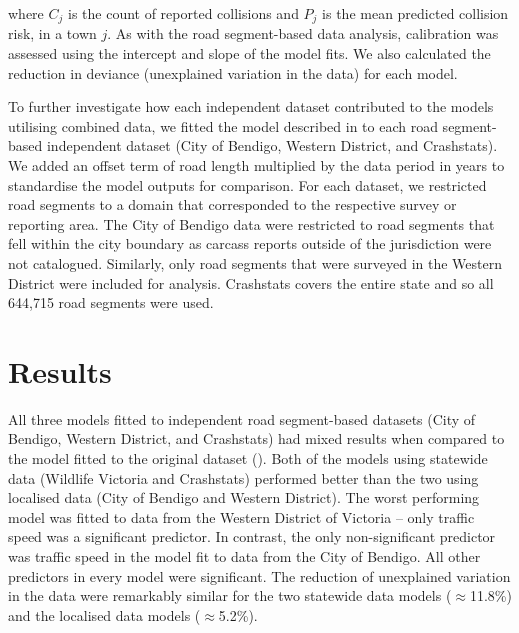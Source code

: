 \noindent where $C_j$ is the count of reported collisions and $P_j$ is the mean predicted collision risk, in a town $j$. As with the road segment-based data analysis, calibration was assessed using the intercept and slope of the model fits. We also calculated the reduction in deviance (unexplained variation in the data) for each model.

To further investigate how each independent dataset contributed to the models utilising combined data, we fitted the model described in  to each road segment-based independent dataset (City of Bendigo, Western District, and Crashstats). We added an offset term of road length multiplied by the data period in years to standardise the model outputs for comparison. For each dataset, we restricted road segments to a domain that corresponded to the respective survey or reporting area. The City of Bendigo data were restricted to road segments that fell within the city boundary as carcass reports outside of the jurisdiction were not catalogued. Similarly, only road segments that were surveyed in the Western District were included for analysis. Crashstats covers the entire state and so all 644,715 road segments were used. 

\section{Results}

All three models fitted to independent road segment-based datasets (City of Bendigo, Western District, and Crashstats) had mixed results when compared to the model fitted to the original dataset (). Both of the models using statewide data (Wildlife Victoria and Crashstats) performed better than the two using localised data (City of Bendigo and Western District). The worst performing model was fitted to data from the Western District of Victoria -- only traffic speed was a significant predictor. In contrast, the only non-significant predictor was traffic speed in the model fit to data from the City of Bendigo. All other predictors in every model were significant. The reduction of unexplained variation in the data were remarkably similar for the two statewide data models ($\approx$11.8\%) and the localised data models ($\approx$5.2\%).

